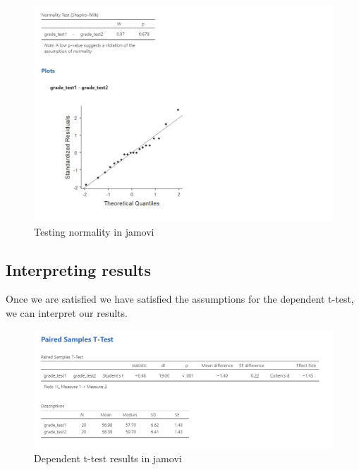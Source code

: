\documentclass[
]{book}
\begin{document}
\begin{figure}

{\centering \includegraphics[width=1\linewidth]{images/03_dependent_t-test/dependent_normality} 

}

\caption{Testing normality in jamovi}\label{fig:unnamed-chunk-2}
\end{figure}

\hypertarget{interpreting-results-1}{%
\subsection{Interpreting results}\label{interpreting-results-1}}

Once we are satisfied we have satisfied the assumptions for the dependent t-test, we can interpret our results.

\begin{figure}

{\centering \includegraphics[width=1\linewidth]{images/03_dependent_t-test/dependent_results} 

}

\caption{Dependent t-test results in jamovi}\label{fig:unnamed-chunk-3}
\end{figure}
\end{document}
